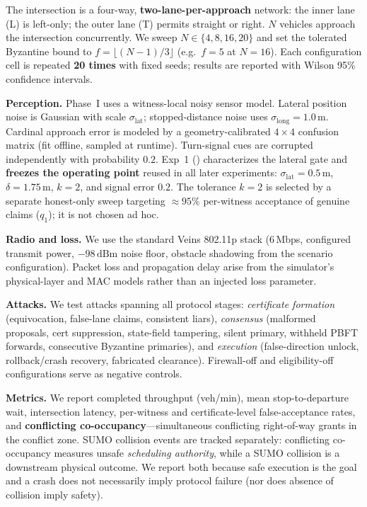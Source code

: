 \documentclass[letterpaper,10pt,conference]{IEEEtran}
\begin{document}
The intersection is a four-way, \textbf{two-lane-per-approach} network: the
inner lane (L) is left-only; the outer lane (T) permits straight or right.
$N$ vehicles approach the intersection concurrently. We sweep
$N \in \{4,8,16,20\}$ and set the tolerated Byzantine bound to
$f = \lfloor(N-1)/3\rfloor$ (e.g.\ $f=5$ at $N=16$). Each configuration cell
is repeated \textbf{20 times} with fixed seeds; results are reported with
Wilson 95\% confidence intervals.

\textbf{Perception.}
Phase~I uses a witness-local noisy sensor model. Lateral position noise is
Gaussian with scale $\sigma_{\mathrm{lat}}$; stopped-distance noise uses
$\sigma_{\mathrm{long}}=1.0\,\mathrm{m}$. Cardinal approach error is modeled
by a geometry-calibrated $4\times4$ confusion matrix (fit offline, sampled at
runtime). Turn-signal cues are corrupted independently with probability
$0.2$. Exp~1 () characterizes the lateral gate and
\textbf{freezes the operating point} reused in all later experiments:
$\sigma_{\mathrm{lat}}=0.5\,\mathrm{m}$, $\delta=1.75\,\mathrm{m}$,
$k=2$, and signal error $0.2$. The tolerance $k=2$ is selected by a separate
honest-only sweep targeting $\approx\!95\%$ per-witness acceptance of genuine
claims ($q_1$); it is not chosen ad hoc.

\textbf{Radio and loss.}
We use the standard Veins 802.11p stack (6\,Mbps, configured transmit power,
$-98\,\mathrm{dBm}$ noise floor, obstacle shadowing from the scenario
configuration). Packet loss and propagation delay arise from the simulator's
physical-layer and MAC models rather than an injected loss parameter.

\textbf{Attacks.}
We test attacks spanning all protocol stages: \emph{certificate formation}
(equivocation, false-lane claims, consistent liars), \emph{consensus}
(malformed proposals, cert suppression, state-field tampering, silent primary,
withheld PBFT forwards, consecutive Byzantine primaries), and \emph{execution}
(false-direction unlock, rollback/crash recovery, fabricated clearance).
Firewall-off and eligibility-off configurations serve as negative controls.

\textbf{Metrics.}
We report completed throughput (veh/min), mean stop-to-departure wait,
intersection latency, per-witness and certificate-level false-acceptance rates,
and \textbf{conflicting co-occupancy}---simultaneous conflicting right-of-way
grants in the conflict zone. SUMO collision events are tracked separately:
conflicting co-occupancy measures unsafe \emph{scheduling authority}, while a
SUMO collision is a downstream physical outcome. We report both because safe
execution is the goal and a crash does not necessarily imply protocol failure
(nor does absence of collision imply safety).
\end{document}
